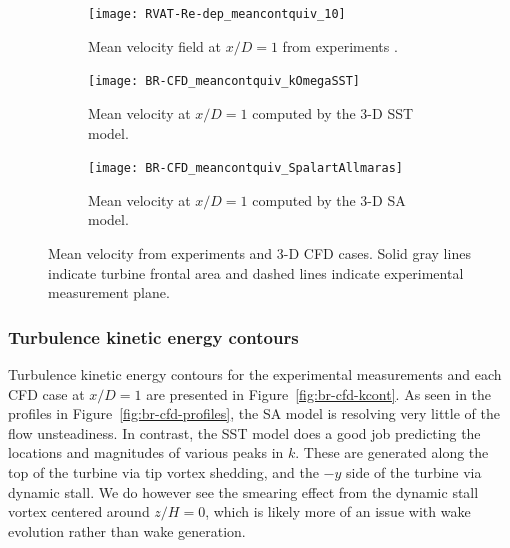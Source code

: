 \documentclass[aip,graphicx]{revtex4-1}
\begin{document}
\begin{figure}
    \centering
    \begin{subfigure}[b]{\textwidth}
        \centering
        
        \texttt{[image: RVAT-Re-dep\_meancontquiv\_10]}
        
        \caption{Mean velocity field at $x/D=1$ from experiments
            \cite{Bachant2016-RVAT-Re-dep}.}
        
        \label{fig:br-cfd-meancontquiv-exp}
    \end{subfigure}
    
    \begin{subfigure}[b]{\textwidth}
        \centering
        
        \texttt{[image: BR-CFD\_meancontquiv\_kOmegaSST]}
        
        \caption{Mean velocity at $x/D=1$ computed by the 3-D SST model.}
        
        \label{fig:meancontquiv-SST}
    \end{subfigure}
    
    \begin{subfigure}[b]{\textwidth}
        \centering
        
        \texttt{[image: BR-CFD\_meancontquiv\_SpalartAllmaras]}
        
        \caption{Mean velocity at $x/D=1$ computed by the 3-D SA model.}
        
        \label{fig:meancontquiv-SA}
    \end{subfigure}
    
    \caption{Mean velocity from experiments and 3-D CFD cases. Solid gray lines
        indicate turbine frontal area and dashed lines indicate experimental
        measurement plane.}
    
    \label{fig:br-cfd-mean-velocity}
\end{figure}


\subsubsection{Turbulence kinetic energy contours}

Turbulence kinetic energy contours for the experimental measurements and each
CFD case at $x/D=1$ are presented in Figure~\ref{fig:br-cfd-kcont}. As seen in
the profiles in Figure~\ref{fig:br-cfd-profiles}, the SA model is resolving very
little of the flow unsteadiness. In contrast, the SST model does a good job
predicting the locations and magnitudes of various peaks in $k$. These are
generated along the top of the turbine via tip vortex shedding, and the $-y$
side of the turbine via dynamic stall. We do however see the smearing effect
from the dynamic stall vortex centered around $z/H=0$, which is likely more of
an issue with wake evolution rather than wake generation.
\end{document}
